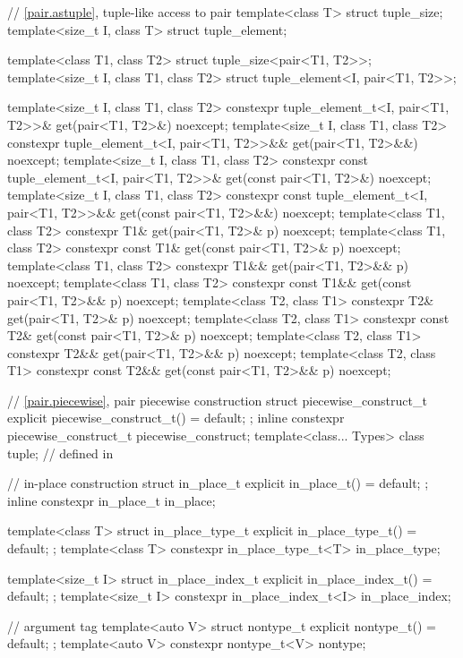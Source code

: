 \begin{codeblock}
{  // \ref{pair.astuple}, tuple-like access to pair
  template<class T> struct tuple_size;
  template<size_t I, class T> struct tuple_element;

  template<class T1, class T2> struct tuple_size<pair<T1, T2>>;
  template<size_t I, class T1, class T2> struct tuple_element<I, pair<T1, T2>>;

  template<size_t I, class T1, class T2>
    constexpr tuple_element_t<I, pair<T1, T2>>& get(pair<T1, T2>&) noexcept;
  template<size_t I, class T1, class T2>
    constexpr tuple_element_t<I, pair<T1, T2>>&& get(pair<T1, T2>&&) noexcept;
  template<size_t I, class T1, class T2>
    constexpr const tuple_element_t<I, pair<T1, T2>>& get(const pair<T1, T2>&) noexcept;
  template<size_t I, class T1, class T2>
    constexpr const tuple_element_t<I, pair<T1, T2>>&& get(const pair<T1, T2>&&) noexcept;
  template<class T1, class T2>
    constexpr T1& get(pair<T1, T2>& p) noexcept;
  template<class T1, class T2>
    constexpr const T1& get(const pair<T1, T2>& p) noexcept;
  template<class T1, class T2>
    constexpr T1&& get(pair<T1, T2>&& p) noexcept;
  template<class T1, class T2>
    constexpr const T1&& get(const pair<T1, T2>&& p) noexcept;
  template<class T2, class T1>
    constexpr T2& get(pair<T1, T2>& p) noexcept;
  template<class T2, class T1>
    constexpr const T2& get(const pair<T1, T2>& p) noexcept;
  template<class T2, class T1>
    constexpr T2&& get(pair<T1, T2>&& p) noexcept;
  template<class T2, class T1>
    constexpr const T2&& get(const pair<T1, T2>&& p) noexcept;

  // \ref{pair.piecewise}, pair piecewise construction
  struct piecewise_construct_t {
    explicit piecewise_construct_t() = default;
  };
  inline constexpr piecewise_construct_t piecewise_construct{};
  template<class... Types> class tuple;         // defined in 

  // in-place construction%
%
%
%
%
%
  struct in_place_t {
    explicit in_place_t() = default;
  };
  inline constexpr in_place_t in_place{};

  template<class T>
    struct in_place_type_t {
      explicit in_place_type_t() = default;
    };
  template<class T> constexpr in_place_type_t<T> in_place_type{};

  template<size_t I>
    struct in_place_index_t {
      explicit in_place_index_t() = default;
    };
  template<size_t I> constexpr in_place_index_t<I> in_place_index{};

  //  argument tag%
%
  template<auto V>
    struct nontype_t {
      explicit nontype_t() = default;
    };
  template<auto V> constexpr nontype_t<V> nontype{};
}
\end{codeblock}

